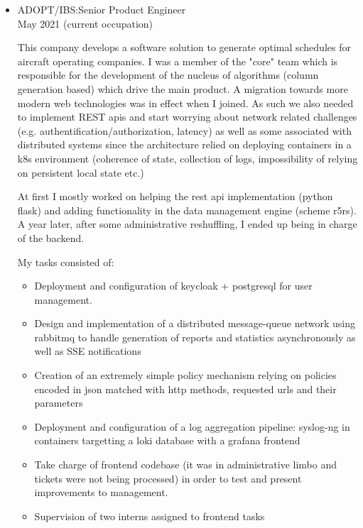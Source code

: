 \documentclass{article}
\begin{document}
\begin{itemize}
        \item ADOPT/IBS:\@ Senior Product Engineer\\ May 2021 (current occupation)

                This company develops a software solution to generate optimal
                schedules for aircraft operating companies.  I was a member of
                the "core" team which is responsible for the development of the
                nucleus of algorithms (column generation based) which drive the
                main product. A migration towards more modern web technologies
                was in effect when I joined. As such we also needed to
                implement REST apis and start worrying about network related
                challenges (e.g. authentification/authorization, latency)
                as well as some associated with distributed systems since the
                architecture relied on deploying containers in a k8s
                environment (coherence of state, collection of logs,
                impossibility of relying on persistent local state etc.)

                At first I mostly worked on helping the rest api
                implementation (python flask) and adding functionality in the
                data management engine (scheme r5rs). A year later, after some
                administrative reshuffling, I ended up being in charge of the
                backend.

                My tasks consisted of:
                \begin{itemize}
                        \item Deployment and configuration of keycloak + postgresql for user management.
                        \item Design and implementation of a distributed message-queue network using rabbitmq to handle generation of reports and statistics asynchronously as well as SSE notifications
                        \item Creation of an extremely simple policy mechanism relying on policies encoded in json matched with http methods, requested urls and their parameters
                        \item Deployment and configuration of a log aggregation pipeline: syslog-ng in containers targetting a loki database with a grafana frontend
                        \item Take charge of frontend codebase (it was in administrative limbo and tickets were not being processed) in order to test and present improvements to management.
                        \item Supervision of two interns assigned to frontend tasks
                \end{itemize}


\end{itemize}
\end{document}
